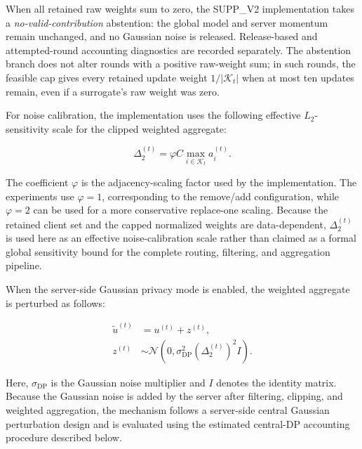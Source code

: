 \documentclass[5p,times,numafflabel]{elsarticle}
\begin{document}
When all retained raw weights sum to zero, the SUPP\_V2
implementation takes a \emph{no-valid-contribution} abstention:
the global model and server momentum remain unchanged, and no
Gaussian noise is released. Release-based and attempted-round
accounting diagnostics are recorded separately. The abstention
branch does not alter rounds with a positive raw-weight sum; in
such rounds, the feasible cap gives every retained update weight
$1/|\mathcal K_t|$ when at most ten updates remain, even if a
surrogate's raw weight was zero.


	For noise calibration, the implementation uses the following
	effective \(L_2\)-sensitivity scale for the clipped weighted aggregate:
	
	\begin{equation}
		\Delta_{2}^{(t)}
		=
		\varphi C
		\max_{i\in\mathcal{K}_{t}}
		a_i^{(t)}.
		\label{eq:aggregate-sensitivity}
	\end{equation}
	
The coefficient \(\varphi\) is the adjacency-scaling factor used by
the implementation. The experiments use \(\varphi=1\), corresponding
to the remove/add configuration, while \(\varphi=2\) can be used for
a more conservative replace-one scaling. Because the retained client
set and the capped normalized weights are data-dependent,
\(\Delta_{2}^{(t)}\) is used here as an effective noise-calibration
scale rather than claimed as a formal global sensitivity bound for
the complete routing, filtering, and aggregation pipeline.
	
When the server-side Gaussian privacy mode is enabled, the
weighted aggregate is perturbed as follows:
	
	\begin{equation}
		\begin{aligned}
			\widetilde{u}^{(t)}
			&=
			u^{(t)}+z^{(t)},\\
			z^{(t)}
			&\sim
			\mathcal{N}\left(
			0,
			\sigma_{\mathrm{DP}}^{2}
			\left(\Delta_{2}^{(t)}\right)^{2}I
			\right).
		\end{aligned}
		\label{eq:gaussian-mechanism}
	\end{equation}
	
	Here, \(\sigma_{\mathrm{DP}}\) is the Gaussian noise multiplier and
	\(I\) denotes the identity matrix. Because the Gaussian noise is added
	by the server after filtering, clipping, and weighted aggregation, the
	mechanism follows a server-side central Gaussian perturbation design
	and is evaluated using the estimated central-DP accounting procedure
	described below.
	
\end{document}
